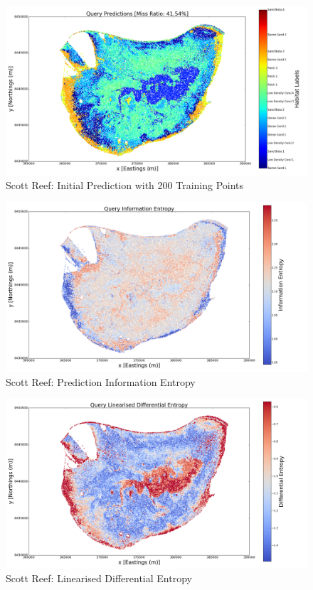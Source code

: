\documentclass{article}
\begin{document}
		\begin{figure}[!htbp]
		\centering
			\includegraphics[width = \linewidth]{Figures/scott_reef_modeling/Figure8.png}
		\caption{Scott Reef: Initial Prediction with 200 Training Points}
		\label{Figure:Results:ScottReefPredictions}
		\end{figure}
	
		\begin{figure}[!htbp]
		\centering
			\includegraphics[width = \linewidth]{Figures/scott_reef_modeling/Figure9.png}
		\caption{Scott Reef: Prediction Information Entropy}
		\label{Figure:Results:ScottReefPredictionInformationEntropy}
		\end{figure}
		
		\begin{figure}[!htbp]
		\centering
			\includegraphics[width = \linewidth]{Figures/scott_reef_modeling/Figure11.png}
		\caption{Scott Reef: Linearised Differential Entropy}
		\label{Figure:Results:ScottReefLinearisedDifferentialEntropy}
		\end{figure}
					
\end{document}
